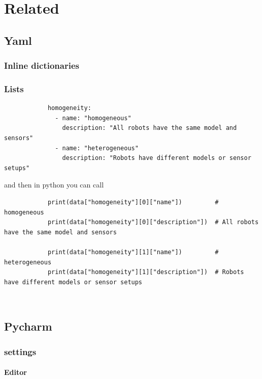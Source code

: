 \chapter{Related}
\section{Yaml}
    
    \subsection{Inline dictionaries}
    
    \subsection{Lists}
        \begin{verbatim}
            homogeneity:
              - name: "homogeneous"
                description: "All robots have the same model and sensors"
              - name: "heterogeneous"
                description: "Robots have different models or sensor setups"
        \end{verbatim}
        and then in python you can call
        \begin{verbatim}
            print(data["homogeneity"][0]["name"])         # homogeneous
            print(data["homogeneity"][0]["description"])  # All robots have the same model and sensors
            
            print(data["homogeneity"][1]["name"])         # heterogeneous
            print(data["homogeneity"][1]["description"])  # Robots have different models or sensor setups
        \end{verbatim}
        
        \begin{verbatim}
        
        \end{verbatim}
        
\section{Pycharm}
    \subsection{settings}
        \subsubsection{Editor}
